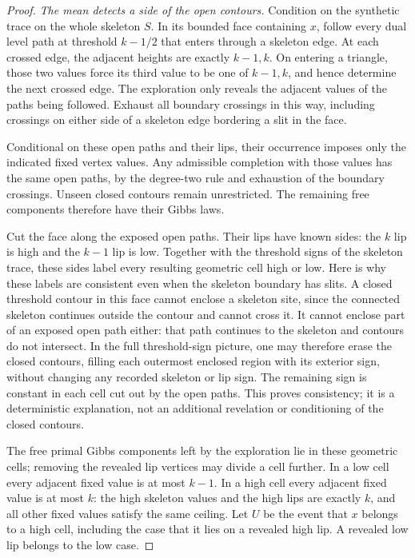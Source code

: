 \begin{proof}
\emph{The mean detects a side of the open contours.}
Condition on the synthetic trace on the whole skeleton $S$.  In its
bounded face containing $x$, follow every dual level path at threshold
$k-1/2$ that enters through a skeleton edge.  At each crossed edge, the
adjacent heights are exactly $k-1,k$.  On entering a triangle, those two
values force its third value to be one of $k-1,k$, and hence determine the
next crossed edge.  The exploration only reveals the adjacent values of
the paths being followed.  Exhaust all boundary crossings in this way,
including crossings on either side of a skeleton edge bordering a slit
in the face.

Conditional on these open paths and their lips, their occurrence imposes
only the indicated fixed vertex values.  Any admissible completion with
those values has the same open paths, by the degree-two rule and exhaustion
of the boundary crossings.  Unseen closed contours remain unrestricted.
The remaining free components therefore have their Gibbs laws.

Cut the face along the exposed open paths.  Their lips have known sides:
the $k$ lip is high and the $k-1$ lip is low.  Together with the threshold
signs of the skeleton trace, these sides label every resulting geometric
cell high or low.  Here is why these labels are consistent even when the
skeleton boundary has slits.  A closed threshold contour in this face
cannot enclose a skeleton site, since the connected skeleton continues
outside the contour and cannot cross it.  It cannot enclose part of an
exposed open path either: that path continues to the skeleton and contours
do not intersect.  In the full threshold-sign picture, one may therefore
erase the closed contours, filling each outermost enclosed region with
its exterior sign, without changing any recorded skeleton or lip sign.
The remaining sign is constant in each cell cut out by the open paths.
This proves consistency; it is a deterministic explanation, not an
additional revelation or conditioning of the closed contours.

The free primal Gibbs components left by the exploration lie in these
geometric cells; removing the revealed lip vertices may divide a cell
further.  In a low cell every adjacent fixed value is at most $k-1$.
In a high cell every adjacent fixed value is at most $k$: the high
skeleton values and the high lips are exactly $k$, and all other fixed
values satisfy the same ceiling.  Let $U$ be the event that $x$ belongs
to a high cell, including the case that it lies on a revealed high lip.
A revealed low lip belongs to the low case.


\end{proof}
